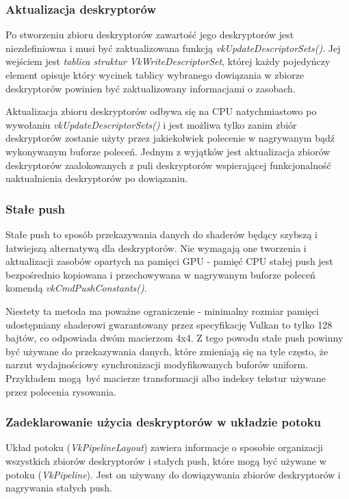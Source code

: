 \subsubsection{Aktualizacja deskryptorów}

Po stworzeniu zbioru deskryptorów zawartość jego deskryptorów jest niezdefiniowna i musi być zaktualizowana funkcją
\textit{vkUpdateDescriptorSets()}. Jej wejściem jest \textit{tablica struktur VkWriteDescriptorSet}, której każdy pojedyńczy element opisuje
który wycinek tablicy wybranego dowiązania w zbiorze deskryptorów powinien być zaktualizowany informacjami o zasobach.

Aktualizacja zbioru deskryptorów odbywa się na CPU natychmiastowo po wywołaniu \textit{vkUpdateDescriptorSets()} i jest możliwa
tylko zanim zbiór deskryptorów zostanie użyty przez jakiekolwiek polecenie w nagrywanym bądź wykonywanym buforze poleceń.
Jednym z wyjątków jest aktualizacja zbiorów deskryptorów zaalokowanych z puli deskryptorów wspierającej funkcjonalność uaktualnienia deskryptorów po dowiązaniu.

\subsubsection{Stałe push}

Stałe push to sposób przekazywania danych do shaderów będący szybszą i łatwiejszą 
alternatywą dla deskryptorów. Nie wymagają one tworzenia i aktualizacji zasobów opartych na pamięci GPU - pamięć CPU stałej push jest bezpośrednio kopiowana i przechowywana w nagrywanym buforze poleceń komendą \textit{vkCmdPushConstants()}.

Niestety ta metoda ma poważne ograniczenie - minimalny rozmiar pamięci udostępniany shaderowi gwarantowany przez specyfikację Vulkan to tylko 128 bajtów, co odpowiada dwóm macierzom 4x4. Z tego powodu stałe push powinny być używane do przekazywania danych, które zmieniają się na tyle często, że narzut wydajnościowy synchronizacji modyfikowanych buforów uniform. Przykładem mogą być macierze transformacji albo indeksy tekstur używane przez polecenia rysowania.


\subsubsection{Zadeklarowanie użycia deskryptorów w układzie potoku}

Układ potoku (\textit{VkPipelineLayout}) zawiera informacje o sposobie organizacji wszystkich zbiorów deskryptorów i stałych push, które mogą być używane w potoku (\textit{VkPipeline}). Jest on używany do dowiązywania zbiorów deskryptorów i nagrywania stałych push.

